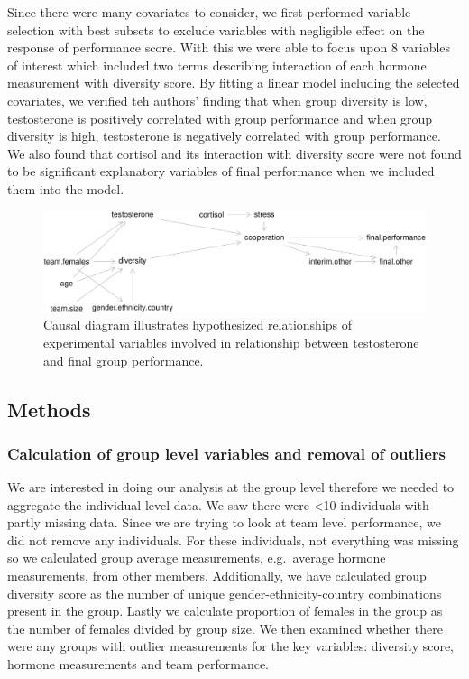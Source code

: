 \documentclass[]{article}
\begin{document}
Since there were many covariates to consider, we first performed
variable selection with best subsets to exclude variables with
negligible effect on the response of performance score. With this we
were able to focus upon 8 variables of interest which included two terms
describing interaction of each hormone measurement with diversity score.
By fitting a linear model including the selected covariates, we verified
teh authors' finding that when group diversity is low, testosterone is
positively correlated with group performance and when group diversity is
high, testosterone is negatively correlated with group performance. We
also found that cortisol and its interaction with diversity score were
not found to be significant explanatory variables of final performance
when we included them into the model.

\begin{figure}
\centering
\includegraphics{19_10_27_hw7_q1_files/figure-latex/causal-1.pdf}
\caption{\label{fig:cause}Causal diagram illustrates hypothesized
relationships of experimental variables involved in relationship between
testosterone and final group performance.}
\end{figure}

\subsection{Methods}\label{methods}

\subsubsection{Calculation of group level variables and removal of
outliers}\label{calculation-of-group-level-variables-and-removal-of-outliers}

We are interested in doing our analysis at the group level therefore we
needed to aggregate the individual level data. We saw there were
\textless{}10 individuals with partly missing data. Since we are trying
to look at team level performance, we did not remove any individuals.
For these individuals, not everything was missing so we calculated group
average measurements, e.g.~average hormone measurements, from other
members. Additionally, we have calculated group diversity score as the
number of unique gender-ethnicity-country combinations present in the
group. Lastly we calculate proportion of females in the group as the
number of females divided by group size. We then examined whether there
were any groups with outlier measurements for the key variables:
diversity score, hormone measurements and team performance.
\end{document}

